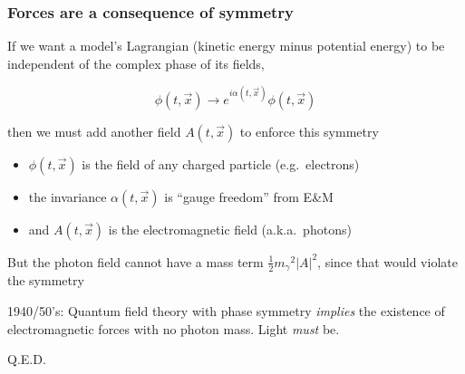 \documentclass[compress]{beamer}
\begin{document}
\begin{frame}
\frametitle{Forces are a consequence of symmetry}

If we want a model's Lagrangian (kinetic energy minus potential energy) to be independent of the complex phase of its fields,

\vspace{-0.1 cm}
\[ \phi(t, \vec{x}) \to e^{i \alpha(t, \vec{x})} \phi(t, \vec{x}) \]

\vspace{0.1 cm}
then we must add another field $A(t, \vec{x})$ to enforce this symmetry

\begin{itemize}
\item $\phi(t, \vec{x})$ is the field of any charged particle (e.g.\ electrons)
\item the invariance $\alpha(t, \vec{x})$ is ``gauge freedom'' from E\&M
\item and $A(t, \vec{x})$ is the electromagnetic field (a.k.a.\ photons)
\end{itemize}

But the photon field cannot have a mass term $\displaystyle \frac{1}{2} {m_\gamma}^2 |A|^2$, since that would violate the symmetry

\vfill
1940/50's: Quantum field theory with phase symmetry {\it implies} the existence of electromagnetic forces with no photon mass.  Light {\it must} be.

Q.E.D.
\end{frame}
\end{document}
